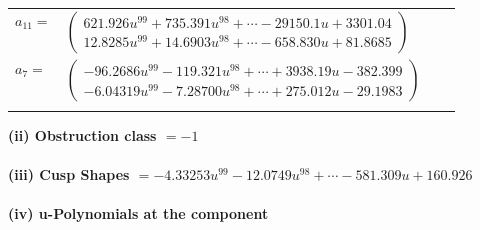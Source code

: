 \documentclass[1p]{elsarticle_modified}
\theoremstyle{definition}
\begin{document}
\begin{tabular}{m{7pt} m{180pt} m{7pt} m{180pt} }
\flushright $a_{11}=$&$\begin{pmatrix}621.926 u^{99}+735.391 u^{98}+\cdots-29150.1 u+3301.04\\12.8285 u^{99}+14.6903 u^{98}+\cdots-658.830 u+81.8685\end{pmatrix}$ \\
\flushright $a_{7}=$&$\begin{pmatrix}-96.2686 u^{99}-119.321 u^{98}+\cdots+3938.19 u-382.399\\-6.04319 u^{99}-7.28700 u^{98}+\cdots+275.012 u-29.1983\end{pmatrix}$\\&\end{tabular}
\flushleft \textbf{(ii) Obstruction class $= -1$}\\~\\
\flushleft \textbf{(iii) Cusp Shapes $= -4.33253 u^{99}-12.0749 u^{98}+\cdots-581.309 u+160.926$}\\~\\
\newpage\renewcommand{\arraystretch}{1}
\flushleft \textbf{(iv) u-Polynomials at the component}\newline \\
\end{document}
